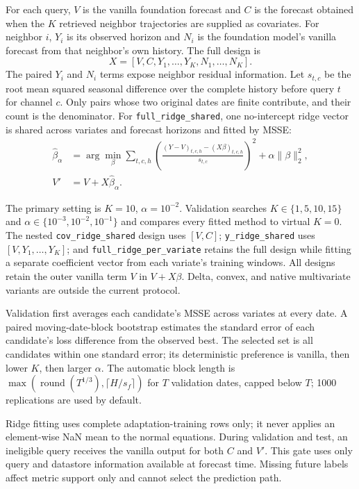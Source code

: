 \documentclass[10pt]{article}
\begin{document}
For each query, $V$ is the vanilla foundation forecast and $C$ is the forecast
obtained when the $K$ retrieved neighbor trajectories are supplied as
covariates. For neighbor $i$, $Y_i$ is its observed horizon and $N_i$ is the
foundation model's vanilla forecast from that neighbor's own history. The full
design is
\begin{equation}
  X = [V,C,Y_1,\ldots,Y_K,N_1,\ldots,N_K].
\end{equation}
The paired $Y_i$ and $N_i$ terms expose neighbor residual information. Let
$s_{t,c}$ be the root mean squared seasonal difference over the complete
history before query $t$ for channel $c$. Only pairs whose two original dates
are finite contribute, and their count is the denominator. For
\texttt{full\_ridge\_shared}, one no-intercept ridge vector is shared across
variates and forecast horizons and fitted by MSSE:
\begin{align}
  \hat\beta_\alpha
    &= \arg\min_\beta \sum_{t,c,h}
       \left(\frac{(Y-V)_{t,c,h}-(X\beta)_{t,c,h}}{s_{t,c}}\right)^2
       + \alpha\|\beta\|_2^2, \\
  V' &= V + X\hat\beta_\alpha.
\end{align}

The primary setting is $K=10$, $\alpha=10^{-2}$. Validation searches
$K\in\{1,5,10,15\}$ and
$\alpha\in\{10^{-3},10^{-2},10^{-1}\}$ and compares every fitted method to
virtual $K=0$. The nested \texttt{cov\_ridge\_shared} design uses $[V,C]$;
\texttt{y\_ridge\_shared} uses $[V,Y_1,\ldots,Y_K]$; and
\texttt{full\_ridge\_per\_variate} retains the full design while fitting a
separate coefficient vector from each variate's training windows. All designs
retain the outer vanilla term $V$ in $V+X\beta$. Delta, convex, and native
multivariate variants are outside the current protocol.

Validation first averages each candidate's MSSE across variates at every
date. A paired moving-date-block bootstrap estimates the standard error of
each candidate's loss difference from the observed best. The selected set is
all candidates within one standard error; its deterministic preference is
vanilla, then lower $K$, then larger $\alpha$. The automatic block length is
$\max(\operatorname{round}(T^{1/3}),\lceil H/s_f\rceil)$ for $T$ validation
dates, capped below $T$; 1000 replications are used by default.

Ridge fitting uses complete adaptation-training rows only; it never applies an
element-wise NaN mean to the normal equations. During validation and test, an
ineligible query receives the vanilla output for both $C$ and $V'$. This gate
uses only query and datastore information available at forecast time. Missing
future labels affect metric support only and cannot select the prediction path.
\end{document}
